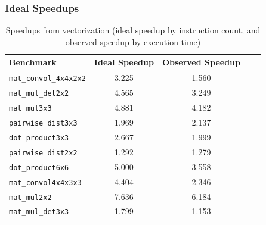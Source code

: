 
\subsubsection*{Ideal Speedups}

\begin{table}
\small
    \caption{Speedups from vectorization (ideal speedup by instruction count, and observed speedup by execution time)}\label{tab:ideal-speedup}
    \begin{tabular}{lcccc}
        \toprule    
        Benchmark & Ideal Speedup & Observed Speedup\\\midrule
        \texttt{mat\_convol\_4x4x2x2} & 3.225 & 1.560\\
        \texttt{mat\_mul\_det2x2} & 4.565 & 3.249\\
        \texttt{mat\_mul3x3} & 4.881 & 4.182\\
        \texttt{pairwise\_dist3x3} & 1.969 & 2.137\\
        \texttt{dot\_product3x3} & 2.667 & 1.999\\
        \texttt{pairwise\_dist2x2} & 1.292 & 1.279\\
        \texttt{dot\_product6x6} & 5.000 & 3.558\\
        \texttt{mat\_convol4x4x3x3} & 4.404 & 2.346\\
        \texttt{mat\_mul2x2} & 7.636 & 6.184\\
        \texttt{mat\_mul\_det3x3} & 1.799 & 1.153\\\bottomrule
    \end{tabular}
\end{table}

